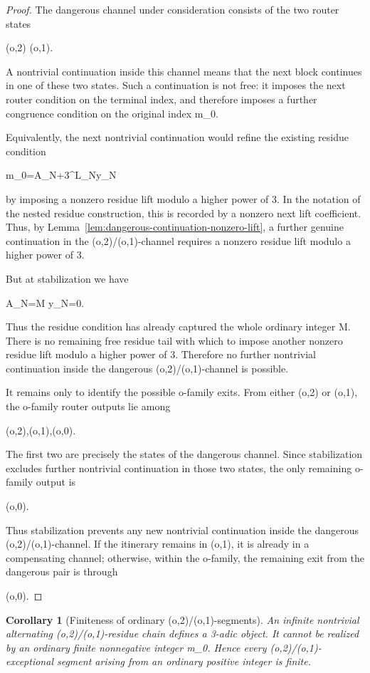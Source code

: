 \documentclass[11pt,letterpaper]{amsart}
\def\({}%
\def\){}%
\def\[{ }%
\def\]{ }%
\theoremstyle{definition}
\theoremstyle{plain}
\theoremstyle{plain}
\newtheorem{corollary}[theorem]{Corollary}
\theoremstyle{remark}
\begin{document}
\begin{proof}
The dangerous channel under consideration consists of the two router
states
\[
(o,2)
\qquad{}\qquad
(o,1).
\]
A nontrivial continuation inside this channel means that the next block
continues in one of these two states.  Such a continuation is not free:
it imposes the next router condition on the terminal index, and therefore
imposes a further congruence condition on the original index \(m_0\).

Equivalently, the next nontrivial continuation would refine the existing
residue condition
\[
m_0=A_N+3^{L_N}y_N
\]
by imposing a nonzero residue lift modulo a higher power of \(3\).  In the notation of the
nested residue construction, this is recorded by a nonzero next lift
coefficient.  Thus, by Lemma~\ref{lem:dangerous-continuation-nonzero-lift}, a further
genuine continuation in the \((o,2)/(o,1)\)-channel requires a nonzero
residue lift modulo a higher power of \(3\).

But at stabilization we have
\[
A_N=M
\qquad{}\qquad
y_N=0.
\]
Thus the residue condition has already captured the whole ordinary
integer \(M\).  There is no remaining free residue tail with which to impose another
nonzero residue lift modulo a higher power of \(3\).  Therefore no further nontrivial
continuation inside the dangerous \((o,2)/(o,1)\)-channel is possible.

It remains only to identify the possible \(o\)-family exits.  From either
\((o,2)\) or \((o,1)\), the \(o\)-family router outputs lie among
\[
(o,2),\qquad (o,1),\qquad (o,0).
\]
The first two are precisely the states of the dangerous channel.  Since
stabilization excludes further nontrivial continuation in those two
states, the only remaining \(o\)-family output is
\[
(o,0).
\]
Thus stabilization prevents any new nontrivial continuation inside the
dangerous \((o,2)/(o,1)\)-channel.  If the itinerary remains in
\((o,1)\), it is already in a compensating channel; otherwise, within the
\(o\)-family, the remaining exit from the dangerous pair is through
\[
(o,0).
\]
\end{proof}



\begin{corollary}[Finiteness of ordinary \((o,2)/(o,1)\)-segments]
\label{cor:ordinary-exceptional-segments-finite}
An infinite nontrivial alternating \((o,2)/(o,1)\)-residue chain defines
a \(3\)-adic object.  It cannot be realized by an ordinary finite
nonnegative integer \(m_0\).  Hence every \((o,2)/(o,1)\)-exceptional
segment arising from an ordinary positive integer is finite.
\end{corollary}
\end{document}
